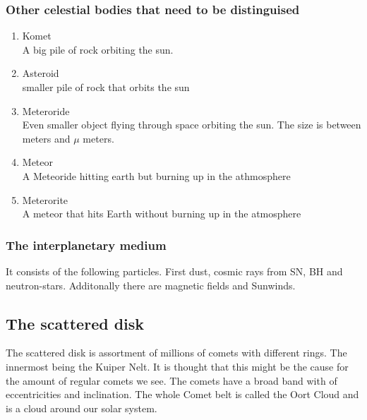 \subsubsection{Other celestial bodies that need to be distinguised}
\begin{enumerate}
    \item  Komet\\
    A big pile of rock orbiting the sun.
    \item Asteroid\\
    smaller pile of rock that orbits the sun
    \item Meteroride\\
    Even smaller object flying through space orbiting the sun. The size is between meters and $\mu$ meters.
    \item Meteor\\
    A Meteoride hitting earth but burning up in the athmosphere
    \item Meterorite\\
     A meteor that hits Earth without burning up in the atmosphere
\end{enumerate}

\subsubsection{The interplanetary medium}
It consists of the following particles. First dust, cosmic rays from \ac{SN}, \ac{BH} and neutron-stars. Additonally there are magnetic fields and Sunwinds.

\subsection{The scattered disk}
The scattered disk is assortment of millions of comets with different rings. The innermost being the Kuiper Nelt. It is thought that this might be the cause for the amount of regular comets we see. The comets have a broad band with of eccentricities and inclination. The whole Comet belt is called the Oort Cloud and is a cloud around our solar system.



